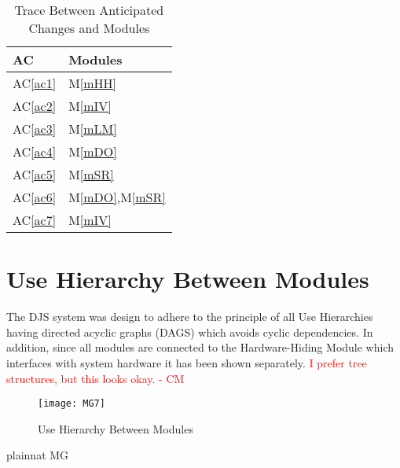 \documentclass[12pt, titlepage]{article}
\newcommand{\acref}[1]{AC\ref{#1}}
\newcommand{\mref}[1]{M\ref{#1}}
\begin{document}
\begin{table}[H]
\centering
\begin{tabular}{p{} p{}}
\toprule
\textbf{AC} & \textbf{Modules}\\
\midrule
\acref{ac1} & \mref{mHH}\\
\acref{ac2} & \mref{mIV}\\
\acref{ac3} & \mref{mLM}\\
\acref{ac4} & \mref{mDO}\\
\acref{ac5} & \mref{mSR}\\
\acref{ac6} & \mref{mDO},\mref{mSR}\\
\acref{ac7} & \mref{mIV}\\
\bottomrule
\end{tabular}
\caption{Trace Between Anticipated Changes and Modules}
\label{TblACT}
\end{table}


\section{Use Hierarchy Between Modules} \label{SecUse}


The DJS system was design to adhere to the principle of all Use Hierarchies having directed acyclic graphs (DAGS) which avoids cyclic dependencies. In addition, since all modules are connected to the Hardware-Hiding Module which interfaces with system hardware it has been shown separately.
\textcolor{red}{I prefer tree structures, but this looks okay. - CM} \\
\begin{figure}[H]
\centering
\texttt{[image: MG7]}
\caption{Use Hierarchy Between Modules}
\label{FigUH}
\end{figure}




 {plainnat}
 {MG}
\end{document}
